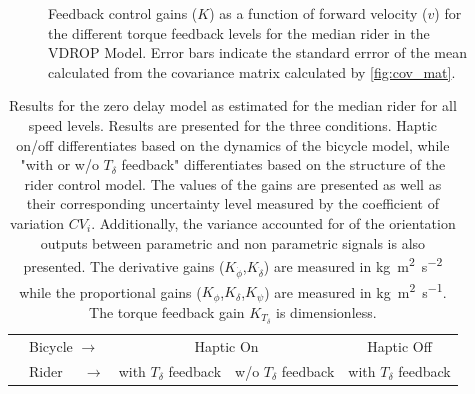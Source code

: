 \begin{figure}
\begin{subfigure}[b]{\textwidth}
            \caption{}            
            \label{fig:gains_speed3}
        \end{subfigure}
        \caption{Feedback control gains (\ensuremath{K}) as a function of forward velocity (\ensuremath{v}) for the different torque feedback levels for the median rider in the VDROP Model. Error bars indicate the standard errror of the mean calculated from the covariance matrix calculated by \cref{fig:cov_mat}.}
        \label{fig:gains_speed}
     \end{figure}




\begin{table}[]
    \caption{ Results for the zero delay model as estimated for the median rider for all speed levels. Results are presented for the three conditions. Haptic on/off differentiates based on the dynamics of the bicycle model, while "with or w/o \ensuremath{T_\delta} feedback" differentiates based on the structure of the rider control model. The values of the gains are presented as well as their corresponding uncertainty level measured by the coefficient of variation \ensuremath{CV_i}. Additionally, the variance accounted for of the orientation outputs between parametric and non parametric signals is also presented. The derivative gains (\ensuremath{K_{\dot{\phi}}},\ensuremath{K_{\dot{\delta}}}) are measured in \si{\kilogram\square\meter\per\square\second} while the proportional gains (\ensuremath{K_{\phi}},\ensuremath{K_{\delta}},\ensuremath{K_{\psi}}) are measured in \si{\kilogram\square\meter\per\second}. The torque feedback gain \ensuremath{K_{T_\delta}} is dimensionless.}
    \label{tb:no_delay}
    \begin{tabular}{llcccccc}
    \hline
                                                   & Bicycle $\rightarrow$                                              & \multicolumn{4}{c}{Haptic On}                                                                                                                                                                         & \multicolumn{2}{c}{Haptic Off}                                                                    \\ \cline{2-8} 
                                                   & {\color[HTML]{333333} Rider $\;\;\;\;\rightarrow$} & \multicolumn{2}{l}{with $T_\delta$ feedback}                                                      & \multicolumn{2}{l}{w/o  $T_\delta$ feedback}                                                      & \multicolumn{2}{l}{with $T_\delta$ feedback}                                                      \\ \cline{2-8} 

\end{tabular}
\end{table}
